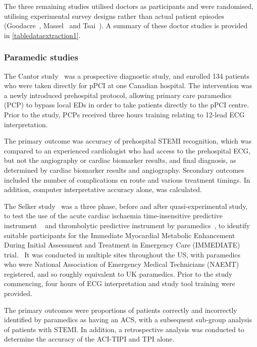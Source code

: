 The three remaining studies utilised doctors as participants and were randomised, utilising experimental survey designs rather than actual patient episodes (Goodacre~\citep{goodacre_computer_2001}, Massel~\citep{massel_observer_2003} and Tsai~\citep{tsai_computer_2003}). A summary of these doctor studies is provided in \autoref{tabledataextraction1}.

  

\subsubsection{Paramedic studies}
\label{paramedicstudies}

The Cantor study~\citep{cantor_prehospital_2012} was a prospective diagnostic study, and enrolled 134 patients who were taken directly for pPCI at one Canadian hospital. The intervention was a newly introduced prehospital protocol, allowing primary care paramedics (PCP) to bypass local EDs in order to take patients directly to the pPCI centre. Prior to the study, PCPs received three hours training relating to 12-lead ECG interpretation.

The primary outcome was accuracy of prehospital STEMI recognition, which was compared to an experienced cardiologist who had access to the prehospital ECG, but not the angiography or cardiac biomarker results, and final diagnosis, as determined by cardiac biomarker results and angiography. Secondary outcomes included the number of complications en route and various treatment timings. In addition, computer interpretative accuracy alone, was calculated.

The Selker study~\citep{selker_emergency_2011} was a three phase, before and after quasi-experimental study, to test the use of the acute cardiac ischaemia time-insensitive predictive instrument ~\citep{selker_use_1998} and thrombolytic predictive instrument by paramedics~\citep{selker_use_2002}, to identify suitable participants for the Immediate Myocardial Metabolic Enhancement During Initial Assessment and Treatment in Emergency Care (IMMEDIATE) trial.~\citep{selker_out--hospital_2012} It was conducted in multiple sites throughout the US, with paramedics who were National Association of Emergency Medical Technicians (NAEMT) registered, and so roughly equivalent to UK paramedics. Prior to the study commencing, four hours of ECG interpretation and study tool training were provided.

The primary outcomes were proportions of patients correctly and incorrectly identified by paramedics as having an ACS, with a subsequent sub-group analysis of patients with STEMI. In addition, a retrospective analysis was conducted to determine the accuracy of the ACI-TIPI and TPI alone.

